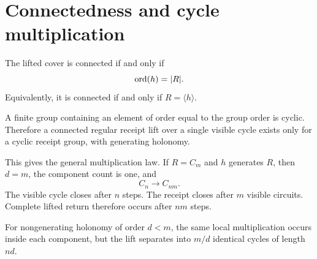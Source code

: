 \section{Connectedness and cycle multiplication}

\begin{corollary}
The lifted cover is connected if and only if
\[
\operatorname{ord}(h)=|R|.
\]
Equivalently, it is connected if and only if $R=\langle h\rangle$.
\end{corollary}

A finite group containing an element of order equal to the group order is
cyclic. Therefore a connected regular receipt lift over a single visible
cycle exists only for a cyclic receipt group, with generating holonomy.

This gives the general multiplication law. If $R=C_m$ and $h$ generates
$R$, then $d=m$, the component count is one, and
\[
C_n\longrightarrow C_{nm}.
\]
The visible cycle closes after $n$ steps. The receipt closes after $m$
visible circuits. Complete lifted return therefore occurs after $nm$ steps.

For nongenerating holonomy of order $d<m$, the same local multiplication
occurs inside each component, but the lift separates into $m/d$ identical
cycles of length $nd$.

